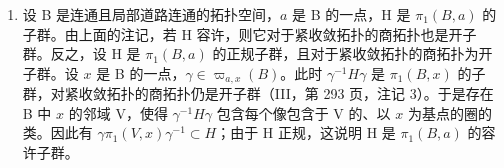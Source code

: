 \begin{enumerate}
\def\labelenumi{\arabic{enumi})}
\setcounter{enumi}{4}
\tightlist
\item
设 B 是连通且局部道路连通的拓扑空间，\(a\) 是 B 的一点，H 是 \(\pi_1(B,a)\) 的子群。由上面的注记，若 H 容许，则它对于紧收敛拓扑的商拓扑也是开子群。反之，设 H 是 \(\pi_1(B,a)\) 的正规子群，且对于紧收敛拓扑的商拓扑为开子群。设 \(x\) 是 B 的一点，\(\gamma \in \varpi_{a,x}(B)\)。此时 \(\gamma^{-1}H\gamma\) 是 \(\pi_1(B,x)\) 的子群，对紧收敛拓扑的商拓扑仍是开子群（III，第 293 页，注记 3）。于是存在 B 中 \(x\) 的邻域 V，使得 \(\gamma^{-1}H\gamma\) 包含每个像包含于 V 的、以 \(x\) 为基点的圈的类。因此有 \(\gamma \pi_1(V,x)\gamma^{-1} \subset H\)；由于 H 正规，这说明 H 是 \(\pi_1(B,a)\) 的容许子群。
\end{enumerate}

